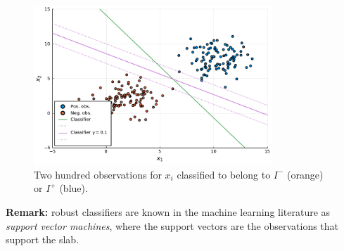 \documentclass{article}
\begin{document}
\begin{figure}[H]
    \includegraphics[width=0.8\textwidth]{Figures/classes_with_robust_classifier.pdf}
    \caption{Two hundred observations for $x_i$ classified to belong to $I^-$ (orange) or $I^+$ (blue).}        
    \label{fig:observations_with_rob_classifier}
\end{figure}


{\bf Remark:} robust classifiers are known in the machine learning literature as \emph{support vector machines}, where the support vectors are the observations that support the slab.  
\end{document}
